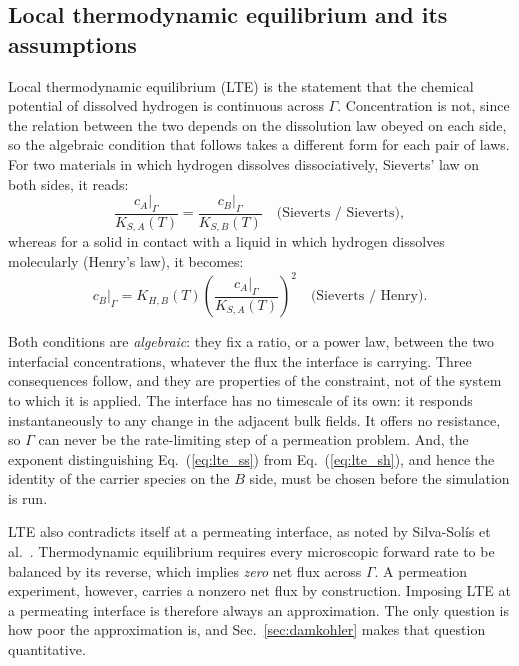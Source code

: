 \documentclass[5p]{elsarticle}
\begin{document}
\subsection{Local thermodynamic equilibrium and its assumptions}
\label{sec:lte}

Local thermodynamic equilibrium (LTE) is the statement that the chemical potential of dissolved hydrogen is continuous across $\Gamma$.
Concentration is not, since the relation between the two depends on the dissolution law obeyed on each side, so the algebraic condition that follows takes a different form for each pair of laws. 
For two materials in which hydrogen dissolves dissociatively, Sieverts' law on both sides, it reads:
\begin{equation}
    \frac{c_A\big|_\Gamma}{K_{S,A}(T)}
    = \frac{c_B\big|_\Gamma}{K_{S,B}(T)}
    \quad \text{(Sieverts / Sieverts)},
    \label{eq:lte_ss}
\end{equation}
whereas for a solid in contact with a liquid in which hydrogen dissolves molecularly (Henry's law), it becomes:
\begin{equation}
    c_B\big|_\Gamma
    = K_{H,B}(T)\left(\frac{c_A\big|_\Gamma}{K_{S,A}(T)}\right)^{2}
    \quad \text{(Sieverts / Henry)} .
    \label{eq:lte_sh}
\end{equation}

Both conditions are \emph{algebraic}: they fix a ratio, or a power law, between the two interfacial concentrations, whatever the flux the interface is carrying.
Three consequences follow, and they are properties of the constraint, not of the system to which it is applied. 
The interface has no timescale of its own: it responds instantaneously to any change in the adjacent bulk fields.
It offers no resistance, so $\Gamma$ can never be the rate-limiting step of a permeation problem.
And, the exponent distinguishing Eq.~(\ref{eq:lte_ss}) from Eq.~(\ref{eq:lte_sh}), and hence the identity of the carrier species on the $B$ side, must be chosen before the simulation is run.

LTE also contradicts itself at a permeating interface, as noted by Silva-Sol\'is et al.~\cite{silva-solis_hydrogen_2026}.
Thermodynamic equilibrium requires every microscopic forward rate to be balanced by its reverse, which implies \emph{zero} net flux across $\Gamma$. 
A permeation experiment, however, carries a nonzero net flux by construction.
Imposing LTE at a permeating interface is therefore always an approximation.
The only question is how poor the approximation is, and Sec.~\ref{sec:damkohler} makes that question quantitative.
\end{document}

